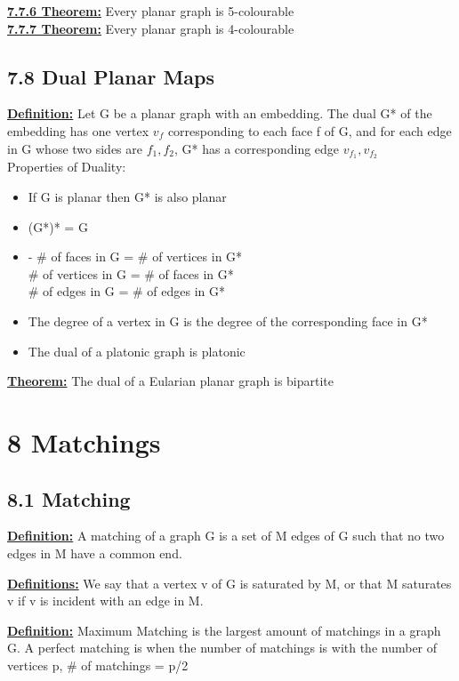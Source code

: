 \documentclass[12pt]{article}
\newcommand{\myt}[1]{\textbf{\underline{#1}}}
\begin{document}
	\myt{7.7.6 Theorem:} Every planar graph is 5-colourable\\
	
	\myt{7.7.7 Theorem:} Every planar graph is 4-colourable\\

	\subsection*{7.8 Dual Planar Maps}
	\myt{Definition:} Let G be a planar graph with an embedding. The dual G* of the embedding has one vertex $v_f$ corresponding to each face f of G, and for each edge in G whose two sides are $f_1, f_2$, G* has a corresponding edge $v_{f_1}, v_{f_2}$\\
	
	Properties of Duality:\\
	\begin{itemize}
		\item If G is planar then G* is also planar
		\item (G*)* = G
		\item - \# of faces in G = \# of vertices in G*\\
		\# of vertices in G = \# of faces in G*\\
		\# of edges in G = \# of edges in G*
		\item The degree of a vertex in G is the degree of the corresponding face in G*
		\item The dual of a platonic graph is platonic
	\end{itemize}
	
	\myt{Theorem:} The dual of a Eularian planar graph is bipartite\\
	
	\section*{8 Matchings}
	\subsection*{8.1 Matching}
	
	\myt{Definition:} A matching of a graph G is a set of M edges of G such that no two edges in M have a common end.
	
	\myt{Definitions:} We say that a vertex v of G is saturated by M, or that M saturates v if v is incident with an edge in M.
	
	\myt{Definition:} Maximum Matching is the largest amount of matchings in a graph G. A perfect matching is when the number of matchings is with the number of vertices p, \# of matchings = p/2\\
	
\end{document}
